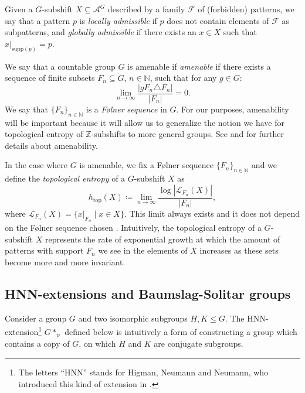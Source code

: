 \documentclass[letterpaper,11pt,reqno]{amsart}
\theoremstyle{plain}
\theoremstyle{definition}
\theoremstyle{cupremark}
\def\htop{h_{\mathrm{top}}}
\begin{document}
Given a $G$-subshift $X\subseteq \mathcal{A}^G$ described by a family $\mathcal{F}$ of (forbidden) patterns, we say that a pattern $p$ is \textit{locally admissible} if $p$ does not contain elements of $\mathcal{F}$ as subpatterns, and \textit{globally admissible} if there exists an $x\in X$ such that $x|_{\mathrm{supp}(p)}=p$.


We say that a countable group $G$ is amenable if \textit{amenable} if there exists a sequence of finite subsets $F_n\subseteq G$, $n\in \mathbb{N}$, such that for any $g\in G$:
$$
\lim_{n\to \infty}\frac{|gF_n\triangle F_n|}{|F_n|}=0.
$$
We say that $\{F_n\}_{n\in \mathbb{N}}$ is a \textit{F\o lner sequence} in $G$. For our purposes, amenability will be important because it will allow us to generalize the notion we have for topological entropy of $\mathbb{Z}$-subshifts to more general groups. See \cite[Chapter 9]{Loh_geometric} and \cite[Chapter 4]{Cellular_automata_and_groups} for further details about amenability.


In the case where $G$ is amenable, we fix a F\o lner sequence $\{F_n\}_{n\in \mathbb{N}}$ and we define the \textit{topological entropy} of a $G$-subshift $X$ as
$$
\htop(X)\coloneqq \lim_{n\to \infty}\frac{\log|\mathcal{L}_{F_n}(X)|}{|F_n|},
$$
where  $\mathcal{L}_{F_n}(X)=\{x|_{F_n}\mid x\in X\}$. This limit always exists and it does not depend on the F\o lner sequence chosen \cite[Theorem~4.38]{Kerr2016}. Intuitively, the topological entropy of a $G$-subshift $X$ represents the rate of exponential growth at which the amount of patterns with support $F_n$ we see in the elements of $X$ increases as these sets become more and more invariant.


\subsection{HNN-extensions and Baumslag-Solitar groups}
Consider a group $G$ and two isomorphic subgroups $H,K\le G$. The HNN-extension\footnote{The letters ``HNN'' stands for Higman, Neumann and Neumann, who introduced this kind of extension in \cite{HNN49}.} $G*_{\psi}$ defined below is intuitively a form of constructing a group which contains a copy of $G$, on which $H$ and $K$ are conjugate subgroups.
\end{document}
